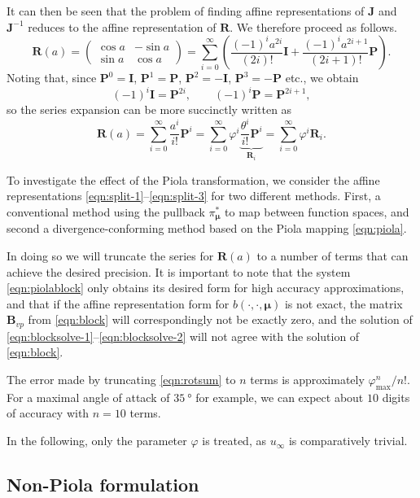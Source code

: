 \documentclass[onecolumn, twoside, a4paper, 11pt]{article}
\begin{document}
It can then be seen that the problem of finding affine representations of
$\bm J$ and $\bm J^{-1}$ reduces to the affine representation of $\bm R$.
We therefore proceed as follows.
\[
  \bm R(a)
  = \begin{pmatrix} \cos a & -\sin a \\ \sin a & \cos a \end{pmatrix}
  = \sum_{i=0}^\infty \left( \frac{(-1)^i a^{2i}}{(2i)!} \bm I
    + \frac{(-1)^i a^{2i+1}}{(2i+1)!} \bm P \right).
\]
Noting that, since $\bm P^0 = \bm I$, $\bm P^1 = \bm P$, $\bm P^2 = -\bm I$,
$\bm P^3 = -\bm P$ etc., we obtain
\[
  (-1)^i \bm I = \bm P^{2i}, \qquad (-1)^i \bm P = \bm P^{2i+1},
\]
so the series expansion can be more succinctly written as
\begin{equation}
  \label{eqn:rotsum}
  \bm R(a) = \sum_{i=0}^\infty \frac{a^i}{i!} \bm P^i
  = \sum_{i=0}^\infty \varphi^i \underbrace{\frac{\theta^i}{i!}\bm P^i}_{\bm R_i}
  = \sum_{i=0}^\infty \varphi^i \bm R_i.
\end{equation}

To investigate the effect of the Piola transformation, we consider the affine
representations \eqref{eqn:split-1}--\eqref{eqn:split-3} for two different
methods. First, a conventional method using the pullback $\pi_{\bm \mu}^*$ to
map between function spaces, and second a divergence-conforming method based on
the Piola mapping \eqref{eqn:piola}.

In doing so we will truncate the series for $\bm R(a)$ to a number of terms that
can achieve the desired precision. It is important to note that the system
\eqref{eqn:piolablock} only obtains its desired form for high accuracy
approximations, and that if the affine representation form for
$b(\cdot,\cdot,\bm \mu)$ is not exact, the matrix $\bm B_{vp}$ from
\eqref{eqn:block} will correspondingly not be exactly zero, and the solution of
\eqref{eqn:blocksolve-1}--\eqref{eqn:blocksolve-2} will not agree with the
solution of \eqref{eqn:block}.

The error made by truncating \eqref{eqn:rotsum} to $n$ terms is approximately
$\varphi_\text{max}^n / n!$. For a maximal angle of attack of
$\SI{35}{\degree}$ for example, we can expect about $10$ digits of accuracy
with $n=10$ terms.

In the following, only the parameter $\varphi$ is treated, as $u_\infty$ is
comparatively trivial.

\subsection{Non-Piola formulation}
\end{document}
